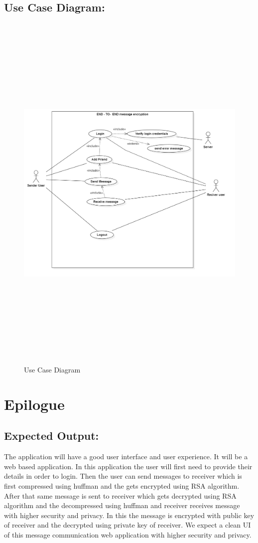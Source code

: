 \section{Use Case Diagram:}
\begin{figure}[H]
	\centering
	\includegraphics[width=180mm, height=180mm]{images/UseCaseDiagram1.png}
	\caption{Use Case Diagram} %
	\label{figusecase} %
\end{figure}




\chapter{Epilogue}

\section{ Expected Output:}
The application will have a good user interface and user experience. It will be a web based application. In this application the user will first need  to provide their details in order to login. Then the user can send messages to receiver which is first compressed using huffman and the gets encrypted using RSA algorithm. After that same message is sent to receiver which gets decrypted using RSA algorithm and the decompressed using huffman and receiver receives message with higher security and privacy. In this the message is encrypted with public key of receiver and the decrypted using private key of receiver. We expect a clean UI of this message communication web application with higher security and privacy.

